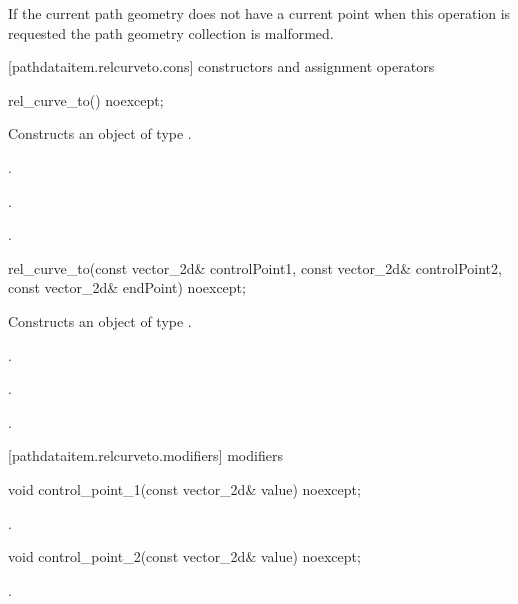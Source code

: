 \pnum
If the current path geometry does not have a current point when this operation is requested the path geometry collection is malformed.

 [pathdataitem.relcurveto.cons] { constructors and assignment operators}

\begin{itemdecl}
    rel_curve_to() noexcept;
\end{itemdecl}
\begin{itemdescr}
	\pnum
	\effects
	Constructs an object of type .
	
	\pnum
	\postconditions
	.

	.

	.

\end{itemdescr}

\begin{itemdecl}
    rel_curve_to(const vector_2d& controlPoint1, const vector_2d& controlPoint2,
      const vector_2d& endPoint) noexcept;
\end{itemdecl}
\begin{itemdescr}
	\pnum
	\effects
	Constructs an object of type .
	
	\pnum
	\postconditions
	.

	.

	.

\end{itemdescr}

 [pathdataitem.relcurveto.modifiers]{ modifiers}

\begin{itemdecl}
    void control_point_1(const vector_2d& value) noexcept;
\end{itemdecl}
\begin{itemdescr}
	\pnum
	\postconditions
	.
	
\end{itemdescr}

\begin{itemdecl}
    void control_point_2(const vector_2d& value) noexcept;
\end{itemdecl}
\begin{itemdescr}
	\pnum
	\postconditions
	.
	
\end{itemdescr}


